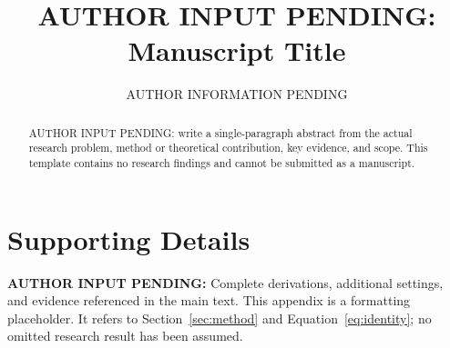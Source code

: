 \documentclass{article}
\title{AUTHOR INPUT PENDING: Manuscript Title}\author{AUTHOR INFORMATION PENDING}
\newcommand{\AuthorPending}[1]{\textbf{AUTHOR INPUT PENDING:} #1}
\begin{document}
\maketitle
\begin{abstract}
AUTHOR INPUT PENDING: write a single-paragraph abstract from the actual research problem,
method or theoretical contribution, key evidence, and scope. This template contains
no research findings and cannot be submitted as a manuscript.
\end{abstract}


\clearpage
\appendix
\section{Supporting Details}
\label{app:supporting}
\AuthorPending{Complete derivations, additional settings, and evidence referenced in the main text.}
This appendix is a formatting placeholder. It refers to Section~\ref{sec:method} and
Equation~\ref{eq:identity}; no omitted research result has been assumed.

\end{document}
